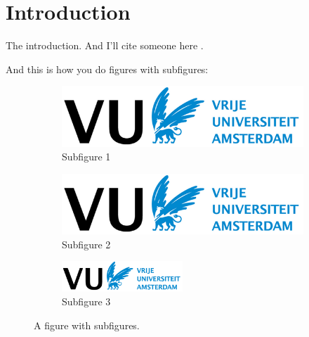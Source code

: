 \section{Introduction}
The introduction.
And I'll cite someone here \cite{author2001}.

And this is how you do figures with subfigures:

\begin{figure}[tb]
    \centering
    \begin{subfigure}[b]{0.49\textwidth}
        \centering
        \includegraphics[width=\textwidth]{images/vrije-universiteit-amsterdam.png}
        \caption{Subfigure 1}
        \label{fig:subfig1}
    \end{subfigure}
    \hfill
    \begin{subfigure}[b]{0.49\textwidth}
        \centering
        \includegraphics[width=\textwidth]{images/vrije-universiteit-amsterdam.png}
        \caption{Subfigure 2}
        \label{fig:subfig2}
    \end{subfigure}

    \begin{subfigure}[b]{\textwidth}
        \centering
        \includegraphics[width=0.5\textwidth]{images/vrije-universiteit-amsterdam.png}
        \caption{Subfigure 3}
        \label{fig:subfig3}
    \end{subfigure}
    \caption{A figure with subfigures.}
    \label{fig:fig}
\end{figure}
